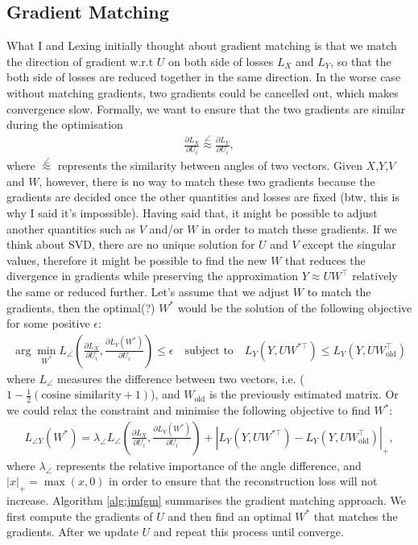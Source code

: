 \documentclass{article} %
\theoremstyle{definition}
\begin{document}
\subsection{Gradient Matching}
What I and Lexing initially thought about gradient matching is that we match the direction of gradient w.r.t $U$ on both side of losses $L_X$ and $L_Y$, so that the both side of losses are reduced together in the same direction. In the worse case without matching gradients, two gradients could be cancelled out, which makes convergence slow. Formally, we want to ensure that the two gradients are similar during the optimisation
\begin{align}
\frac{\partial L_X}{\partial U_i} \stackrel{\angle}{\approx} \frac{\partial L_Y}{\partial U_i},
\end{align}
where $\stackrel{\angle}{\approx}$ represents the similarity between angles of two vectors. Given $X$,$Y$,$V$ and $W$, however, there is no way to match these two gradients because the gradients are decided once the other quantities and losses are fixed (btw, this is why I said it's impossible). Having said that, it might be possible to adjust another quantities such as $V$ and/or $W$ in order to match these gradients. If we think about SVD, there are no unique solution for $U$ and $V$ except the singular values, therefore it might be possible to find the new $W$ that reduces the divergence in gradients while preserving the approximation $Y \approx UW^\top$ relatively the same or reduced further. Let's assume that we adjust $W$ to match the gradients, then the optimal(?)  $W^*$ would be the solution of the following objective for some positive $\epsilon$:
\begin{align}
\label{eqn:matching_obj}
\arg\min_{W^*}L_{\angle}(\frac{\partial L_X}{\partial U_i}, \frac{\partial L_Y(W^*)}{\partial U_i}) \leq \epsilon \quad \text{subject to} \quad L_Y(Y, UW^{*\top}) \leq L_Y(Y, UW_{\text{old}}^\top)
\end{align}
where $L_{\angle}$ measures the difference between two vectors, i.e. ($1 - \frac{1}{2}(\text{cosine similarity}+1)$), and $W_{\text{old}}$ is the previously estimated matrix. Or we could relax the constraint and minimise the following objective to find $W^*$:
\begin{align}
L_{\angle Y}(W^*) = \lambda_\angle L_{\angle}(\frac{\partial L_X}{\partial U_i}, \frac{\partial L_Y(W^*)}{\partial U_i}) + |L_Y(Y, UW^{*\top}) - L_Y(Y, UW_{\text{old}}^\top)|_{+},
\end{align}
where $\lambda_\angle$ represents the relative importance of the angle difference, and $|x|_+ = \max(x, 0)$ in order to ensure that the reconstruction loss will not increase. Algorithm \ref{alg:jmfgm} summarises the gradient matching approach. We first compute the gradients of $U$ and then find an optimal $W^*$ that matches the gradients. After we update $U$ and repeat this process until converge.
\end{document}

